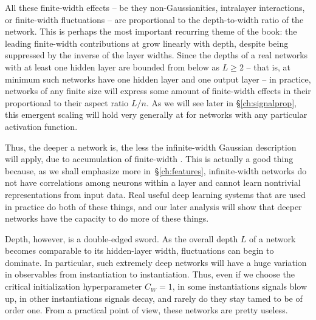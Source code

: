 All these finite-width effects -- be they non-Gaussianities, intralayer interactions, or finite-width fluctuations --  are proportional to the depth-to-width ratio of the network.
This is perhaps the most important recurring theme of the book: the leading finite-width contributions at  grow linearly with depth, despite being suppressed by the inverse of the layer widths.
Since the depths of a real networks with at least one hidden layer are bounded from below as $L \ge 2$ -- that is, at minimum such networks have one hidden layer and one output layer -- in practice, networks of any finite size will express some amount of finite-width effects in their  proportional to their aspect ratio $L/n$.
As we will see later in \S\ref{ch:signalprop}, this emergent scaling will hold very generally
at  for networks with any particular activation function.

Thus, the deeper a network is, the less the infinite-width Gaussian description will apply, due to accumulation of finite-width . This is actually a good thing because, as we shall emphasize more in~\S\ref{ch:features}, 
infinite-width networks do not have correlations among neurons within a layer 
and cannot learn %
nontrivial
representations from input data.
Real useful deep learning systems that are used in practice do both of these things, and our later analysis will show that
deeper networks have the capacity to do more of these things.

Depth, however, is a double-edged sword.
As the overall depth $L$ of a network becomes comparable to its hidden-layer width, fluctuations can begin to dominate. %
In particular, such extremely deep networks will have a huge variation in observables from instantiation to instantiation. Thus, even if we choose the critical initialization hyperparameter $C_W=1$, in some instantiations signals blow up, in other instantiations signals decay, and rarely do they stay tamed to be of order one. From a practical point of view, these networks are pretty useless.






